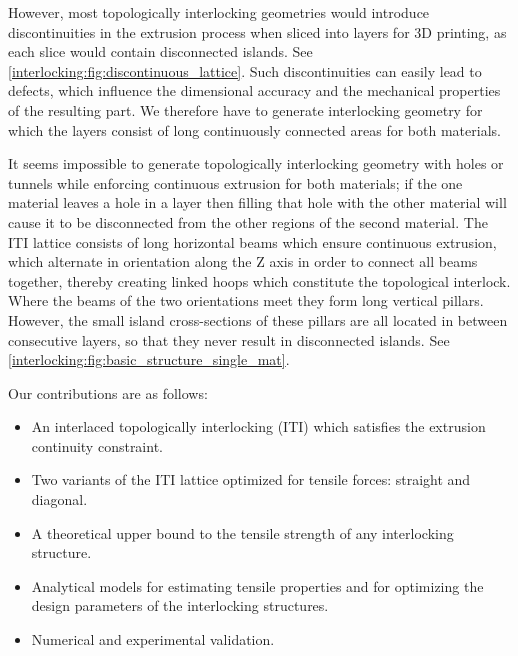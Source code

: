 However, most topologically interlocking geometries would introduce discontinuities in the extrusion process when sliced into layers for 3D printing, as each slice would contain disconnected islands.
See \cref{interlocking:fig:discontinuous_lattice}.
Such discontinuities can easily lead to defects, which influence the dimensional accuracy and the mechanical properties of the resulting part.
We therefore have to generate interlocking geometry for which the layers consist of long continuously connected areas for both materials.

It seems impossible to generate topologically interlocking geometry with holes or tunnels while enforcing continuous extrusion for both materials;
if the one material leaves a hole in a layer then filling that hole with the other material will cause it to be disconnected from the other regions of the second material.
The ITI lattice consists of long horizontal beams which ensure continuous extrusion, which alternate in orientation along the Z axis in order to connect all beams together, thereby creating linked hoops which constitute the topological interlock.
Where the beams of the two orientations meet they form long vertical pillars. %
However, the small island cross-sections of these pillars are all located in between consecutive layers, so that they never result in disconnected islands.
See \cref{interlocking:fig:basic_structure_single_mat}.


Our contributions are as follows:
\begin{itemize}
	\item An interlaced topologically interlocking  (ITI) which satisfies the extrusion continuity constraint.
	\item Two variants of the ITI lattice optimized for tensile forces: straight and diagonal.
	\item A theoretical upper bound to the tensile strength of any interlocking structure.
	\item Analytical models for estimating tensile properties and for optimizing the design parameters of the interlocking structures.
	\item Numerical and experimental validation.
\end{itemize}






